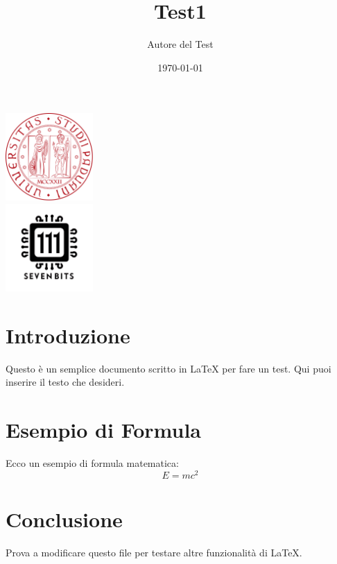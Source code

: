 \documentclass[a4paper,12pt]{article}
\title{Test1}
\author{Autore del Test}
\date{\today} %
\begin{document}
\maketitle

\center 
\includegraphics[width=0.25\textwidth]{LogoUnipd}\\
\includegraphics[width=0.25\textwidth]{Sevenbitslogo}\\

\section{Introduzione}
Questo è un semplice documento scritto in \LaTeX{} per fare un test. Qui puoi inserire il testo che desideri.

\section{Esempio di Formula}
Ecco un esempio di formula matematica:
\[
E = mc^2
\]

\section{Conclusione}
Prova a modificare questo file per testare altre funzionalità di \LaTeX.
\end{document}

